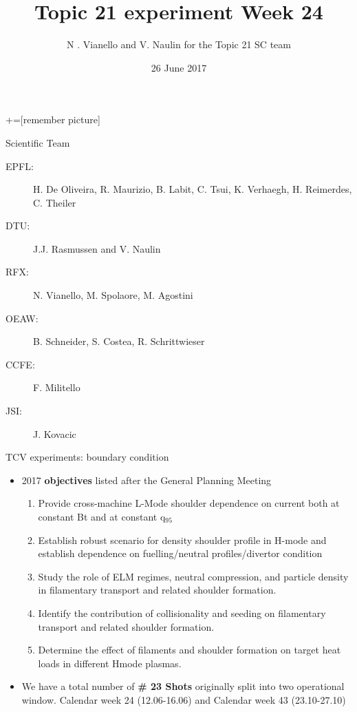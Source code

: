 \documentclass[10pt, compress]{beamer}
\title{Topic 21 experiment Week 24}
\date{26 June 2017}
\author[N. Vianello,  V. Naulin]{N . Vianello and V. Naulin for the
  Topic 21 SC team}
\newcommand\Fontvi{\fontsize{8}{7.2}\selectfont}
\begin{document}
+=[remember picture]
\maketitle
\begin{frame}{Scientific Team}
  \begin{description}
  \item[EPFL:] H. De Oliveira, R. Maurizio, B. Labit,
    C. Tsui, K. Verhaegh, H. Reimerdes, C. Theiler
  \item[DTU:] J.J. Rasmussen and V. Naulin
  \item[RFX:] N. Vianello, M. Spolaore, M. Agostini
  \item[OEAW:] B. Schneider, S. Costea, R. Schrittwieser
  \item[CCFE:] F. Militello
  \item[JSI:] J. Kovacic
  \end{description}
\end{frame}
\begin{frame}{TCV experiments: boundary condition}
\vspace{-1cm}
\Fontvi
\begin{itemize}
\item 2017 \textbf{objectives} listed after the General Planning Meeting
  \begin{enumerate}
  \item Provide cross-machine \alert{L-Mode} shoulder dependence on
    current both at constant Bt and at constant q$_{95}$
  \item Establish robust scenario for density shoulder profile in
        H-mode and establish dependence on fuelling/neutral
        profiles/divertor condition
  \item Study the role of ELM regimes, neutral compression, and
    particle density in filamentary transport and related shoulder
    formation.
  \item Identify the contribution of collisionality and
    seeding on filamentary transport and related shoulder
    formation.
  \item Determine the effect of filaments and shoulder
    formation on target heat loads in different Hmode plasmas.
  \end{enumerate}
\item We have a total number of \textbf{\# 23 Shots} originally split into two
    operational window. Calendar week 24 (12.06-16.06) and Calendar
    week 43 (23.10-27.10)
\end{itemize}
\end{frame}
\end{document}
